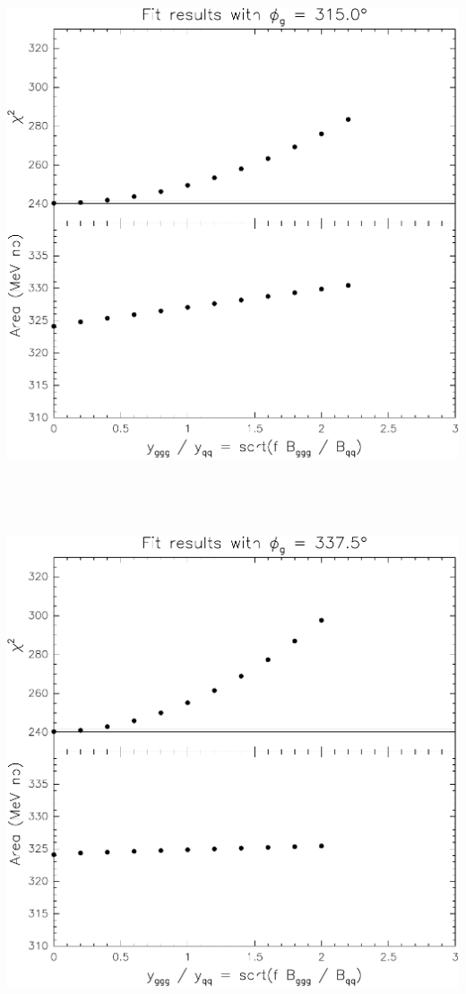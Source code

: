 \documentclass[12pt]{article}
\begin{document}
\vfill

\mbox{ }

\pagebreak

\mbox{ }

\vfill

\includegraphics[width=\linewidth]{interference-o}

\vfill

\mbox{ }

\pagebreak

\mbox{ }

\vfill

\includegraphics[width=\linewidth]{interference-p}
\end{document}
